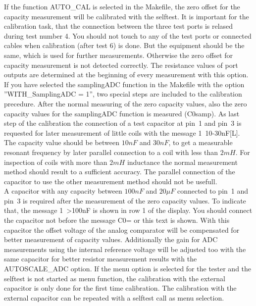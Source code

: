 If the function AUTO\_CAL is selected in the Makefile, 
the zero offset for the capacity measurement will be calibrated with the selftest.
It is important for the calibration task, that the connection between the three test ports is relased 
during test number 4. 
You should not touch to any of the test ports or connected cables when calibration (after test 6) is done.
But the equipment should be the same, which is used for further measurements.
Otherwise the zero offset for capacity measurement is not detected correctly.
The resistance values of port outputs are determined at the beginning of every measurement with this option.\\

If you have selected the samplingADC function in the Makefile with the option ''WITH\_SamplingADC = 1'',
two special steps are included to the calibration precedure.
After the normal measuring of the zero capacity values, also the zero capacity values for the samplingADC function is
measured (C0samp). As last step of the calibration the connection of a test capacitor at pin~1 and pin~3 is requested for
later measurement of little coils with the message \mbox{1   10-30nF[L]}.
The capacity value should be between \(10nF\) and \(30nF\),
to get a measurable resonant frequency by later parallel connection to a coil with less than \(2mH\).
For inspection of coils with more than \(2mH\) inductance the normal measurement method should result to a
sufficient accuracy. The parallel connection of the capacitor to use the other measurement method should
not be usefull.\\

A capacitor with any capacity between \(100nF\) and \(20\mu F\) connected to pin~1 and pin~3 is
required after the measurement of the zero capacity values.
To indicate that, the message \mbox{1  \textgreater 100nF} is shown in row 1 of the display.
You should connect the capacitor not before the message C0= or this text is shown.
With this capacitor the offset voltage of the analog comparator will be compensated for better measurement
of capacity values.  
Additionally the gain for ADC measurements using the internal reference voltage will be adjusted too 
with the same capacitor for better resistor measurement results with the AUTOSCALE\_ADC option.
If the menu option is selected for the tester and the selftest is not started as menu function,
the calibration with the external capacitor is only done for the first time calibration.
The calibration  with the external capacitor can be repeated with a selftest call as menu selection.


